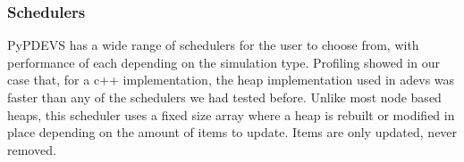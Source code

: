\subsubsection{Schedulers}
PyPDEVS has a wide range of schedulers for the user to choose from, with performance of each depending on the simulation type. Profiling showed in our case that, for a c++ implementation, the heap implementation used in adevs was faster than any of the schedulers we had tested before. Unlike most node based heaps, this scheduler uses a fixed size array where a heap is rebuilt or modified in place depending on the amount of items to update. Items are only updated, never removed.
